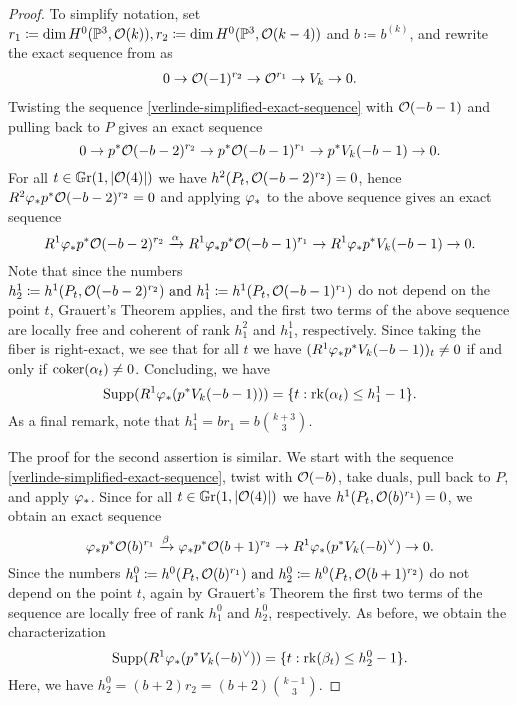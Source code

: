\begin{proof}
To simplify notation, set
$r_1 \coloneqq \dim H^0(\mathbb{P}^3, \mathcal{O}(k)),
r_2 \coloneqq \dim H^0(\mathbb{P}^3, \mathcal{O}(k-4))$ and $b\coloneqq b^{(k)}$,
and rewrite the exact sequence from  as
\begin{align} \label{verlinde-simplified-exact-sequence}
\ses{\mc{O}(-1)^{r_2}}{\mc{O}^{r_1}}{V_k}. %
\end{align}
Twisting the sequence \cref{verlinde-simplified-exact-sequence} with $\mathcal{O}(-b-1)$ and pulling back to $P$ gives an exact sequence
\[
0
\to  {p^{*}\mathcal{O}(-b-2)^{r_2}}
\to  {p^{*}\mathcal{O}(-b-1)^{r_1}}
\to  {p^{*}V_k(-b-1)}
\to  0.
\]
For all $t\in \mathbb G \mathrm r(1,\lvert\mathcal{O}(4)\rvert)$ we have
$h^2(P_t, \mathcal{O}(-b-2)^{r_2}) = 0$,
hence
$R^2\varphi_{*}p^{*}\mathcal{O}(-b-2)^{r_2} = 0$
and applying $\varphi_{*}$ to the above sequence gives an exact sequence
\[
R^1\varphi_{*}p^{*}\mathcal{O}(-b-2)^{r_2}
\xrightarrow{\alpha}
R^1\varphi_{*}p^{*}\mathcal{O}(-b-1)^{r_1} 
\to
R^1\varphi_{*}p^{*} V_k(-b-1)
\to 0.
\]
Note that since the numbers
$
h^{1}_{2}\coloneqq h^1(P_t, \mathcal{O}(-b-2)^{r_2})
\text{ and }
h_{1}^{1}\coloneqq h^1(P_t, \mathcal{O}(-b-1)^{r_1})
$
do not depend on the point $t$, Grauert's Theorem applies, and the first two terms of the above sequence are locally free and coherent of rank $h_1^2$ and $h_1^1$, respectively. Since taking the fiber is right-exact, we see that for all $t$ we have
$(R^1\varphi_{*}p^{*} V_k(-b-1))_t \neq 0$ if and only if $\operatorname{coker}(\alpha_t) \neq 0$. Concluding, we have
\[
\operatorname{Supp}(R^1\varphi_{*}(p^{*} V_k(-b-1)))
= \{t : \operatorname{rk} (\alpha_t)\leq h^{1}_1 - 1\}.
\]
As a final remark, note that $h^1_1 = b r_1 = b \binom{k+3}{3}.$

The proof for the second assertion is similar. We start with the sequence \cref{verlinde-simplified-exact-sequence}, twist with $\mathcal{O}(-b)$, take duals, pull back to $P$, and apply $\varphi_{*}$. Since for all $t\in \mathbb G \mathrm r(1,\lvert\mathcal{O}(4)\rvert)$ we have $h^1(P_t, \mathcal{O}(b)^{r_1})=0$, we obtain an exact sequence
\[
	{\varphi_{*}p^{*}\mathcal{O}(b)^{r_1} }
\xrightarrow{\beta}	{\varphi_{*}p^{*}\mathcal{O}(b+1)^{r_2}}
\to	{R^1 \varphi_{*}(p^{*} V_{k}(-b)^\vee)}
\to 0.
\]
Since the numbers
$
h^0_1 \coloneqq h^0(P_t,\mathcal{O}(b)^{r_1}) \text{ and }
h^0_2 \coloneqq h^0(P_t, \mathcal{O}(b+1)^{r_2})
$
do not depend on the point $t$, again by Grauert's Theorem the first two terms of the sequence are locally free of rank $h^0_1$ and $h^0_2$, respectively. As before, we obtain the characterization
\[
	\operatorname{Supp}(R^1 \varphi_{*}(p^{*} V_{k}(-b)^\vee))
	= \{t : \operatorname{rk} (\beta_t)\leq h^{0}_2 - 1\}.
\]
Here, we have $h_2^0 = (b+2)r_2 = (b+2)\binom{k-1}{3}.$
\end{proof}

